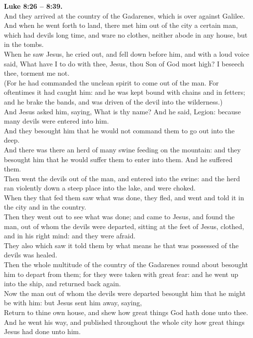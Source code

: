 \documentclass[10pt]{article} %
\begin{document}
{\begin{minipage}[t]{0.45\textwidth}
\textbf{Luke 8:26 -- 8:39.}\\
And they arrived at the country of the Gadarenes, which is over against Galilee.\\
And when he went forth to land, there met him out of the city a certain man, which had devils long time, and ware no clothes, neither abode in any house, but in the tombs.\\
When he saw Jesus, he cried out, and fell down before him, and with a loud voice said, What have I to do with thee, Jesus, thou Son of God most high? I beseech thee, torment me not.\\
(For he had commanded the unclean spirit to come out of the man. For oftentimes it had caught him: and he was kept bound with chains and in fetters; and he brake the bands, and was driven of the devil into the wilderness.)\\
And Jesus asked him, saying, What is thy name? And he said, Legion: because many devils were entered into him.\\
And they besought him that he would not command them to go out into the deep.\\
And there was there an herd of many swine feeding on the mountain: and they besought him that he would suffer them to enter into them. And he suffered them.\\
Then went the devils out of the man, and entered into the swine: and the herd ran violently down a steep place into the lake, and were choked.\\
When they that fed them saw what was done, they fled, and went and told it in the city and in the country.\\
Then they went out to see what was done; and came to Jesus, and found the man, out of whom the devils were departed, sitting at the feet of Jesus, clothed, and in his right mind: and they were afraid.\\
They also which saw it told them by what means he that was possessed of the devils was healed.\\
Then the whole multitude of the country of the Gadarenes round about besought him to depart from them; for they were taken with great fear: and he went up into the ship, and returned back again.\\
Now the man out of whom the devils were departed besought him that he might be with him: but Jesus sent him away, saying,\\
Return to thine own house, and shew how great things God hath done unto thee. And he went his way, and published throughout the whole city how great things Jesus had done unto him.\\
\end{minipage}}
\end{document}
